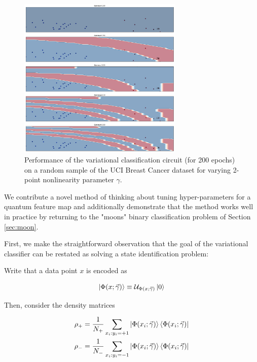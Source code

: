 \documentclass{beamer}
\newcommand\0{\mathbf{0}}
\newcommand\<{\langle}
\renewcommand\>{\rangle}
\begin{document}
\begin{frame}
\begin{figure}[H]
\label{fig:breast_cancer_gammas}
\centering
\includegraphics[width=0.7\textwidth]{images/breast_cancer_gammas}	
\caption{Performance of the variational classification circuit (for 200 epochs) on a random sample of the UCI Breast Cancer dataset for varying 2-point nonlinearity parameter $\gamma$.}
\end{figure}
\end{frame}

\begin{frame}
We contribute a novel method of thinking about tuning hyper-parameters for a quantum feature map and additionally demonstrate that the method works well in practice by returning to the "moons" binary classification problem of Section \ref{sec:moon}.

First, we make the straightforward observation that the goal of the variational classifier can be restated as solving a state identification problem:

Write that a data point $x$ is encoded as

\begin{align*}
\ket{\Phi(x; \vec{\gamma})} \equiv \mathcal{U}_{\Phi(x; \vec{\gamma})}\ket{0}
\end{align*}

Then, consider the density matrices

\begin{align*}
\rho_+ &= \frac{1}{N_+} \sum_{x_i : y_i = +1} \ket{\Phi(x_i; \vec{\gamma})}\bra{\Phi(x_i; \vec{\gamma})}	\\
\rho_- &= \frac{1}{N_-} \sum_{x_i : y_i = -1} \ket{\Phi(x_i; \vec{\gamma})}\bra{\Phi(x_i; \vec{\gamma})}	
\end{align*}

\end{frame}
\end{document}
